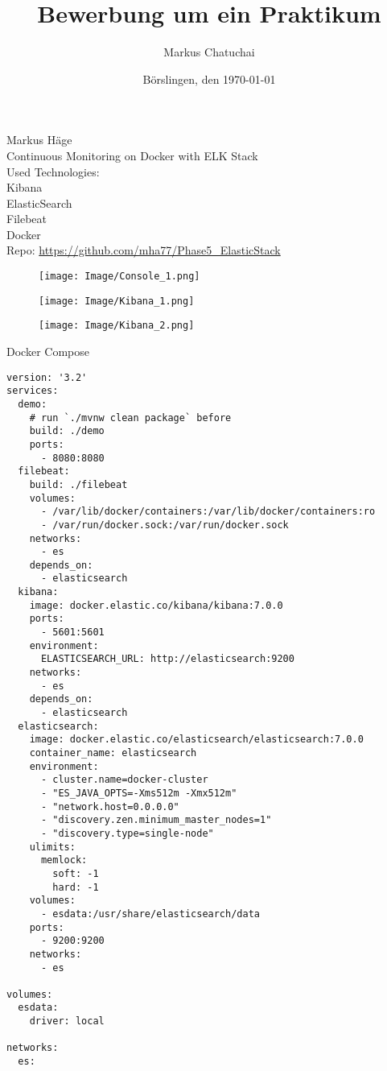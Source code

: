 \documentclass[12pt,a4paper]{article}
\title{Bewerbung um ein Praktikum}
\author{Markus Chatuchai}
\date{Börslingen, den \today}
\begin{document}
Markus Häge\\
{\Large Continuous Monitoring on Docker with ELK Stack}\\

Used Technologies:\\
Kibana\\
ElasticSearch\\
Filebeat\\
Docker\\
Repo: \url{https://github.com/mha77/Phase5_ElasticStack}\\


\begin{figure}
  \texttt{[image: Image/Console\_1.png]}
\end{figure}

\begin{figure}
  \texttt{[image: Image/Kibana\_1.png]}
\end{figure}

\begin{figure}
  \texttt{[image: Image/Kibana\_2.png]}
\end{figure}


\newpage

Docker Compose
\begin{lstlisting}
version: '3.2'
services:
  demo:
    # run `./mvnw clean package` before
    build: ./demo
    ports:
      - 8080:8080
  filebeat:
    build: ./filebeat
    volumes:
      - /var/lib/docker/containers:/var/lib/docker/containers:ro
      - /var/run/docker.sock:/var/run/docker.sock
    networks:
      - es
    depends_on:
      - elasticsearch
  kibana:
    image: docker.elastic.co/kibana/kibana:7.0.0
    ports:
      - 5601:5601
    environment:
      ELASTICSEARCH_URL: http://elasticsearch:9200
    networks:
      - es
    depends_on:
      - elasticsearch
  elasticsearch:
    image: docker.elastic.co/elasticsearch/elasticsearch:7.0.0
    container_name: elasticsearch
    environment:
      - cluster.name=docker-cluster
      - "ES_JAVA_OPTS=-Xms512m -Xmx512m"
      - "network.host=0.0.0.0"
      - "discovery.zen.minimum_master_nodes=1"
      - "discovery.type=single-node"
    ulimits:
      memlock:
        soft: -1
        hard: -1
    volumes:
      - esdata:/usr/share/elasticsearch/data
    ports:
      - 9200:9200
    networks:
      - es

volumes:
  esdata:
    driver: local

networks:
  es:
\end{lstlisting}
\end{document}
